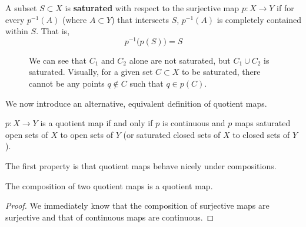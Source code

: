     \begin{definition}[Saturation]
      A subset $S \subset X$ is \textbf{saturated} with respect to the surjective map $p: X \rightarrow Y$ if for every $p^{-1} (A)$ (where $A \subset Y$) that intersects $S$, $p^{-1}(A)$ is completely contained within $S$. That is, 
      \begin{equation}
        p^{-1} \big( p(S) \big) = S
      \end{equation}

      \begin{figure}[H]
        \centering 
        \caption{We can see that $C_1$ and $C_2$ alone are not saturated, but $C_1 \cup C_2$ is saturated. Visually, for a given set $C \subset X$ to be saturated, there cannot be any points $q \not\in C$ such that $q \in p(C)$. }
        \label{fig:saturation}
      \end{figure}
    \end{definition}

    We now introduce an alternative, equivalent definition of quotient maps. 

    \begin{theorem}
      $p: X \rightarrow Y$ is a quotient map if and only if $p$ is continuous and $p$ maps saturated open sets of $X$ to open sets of $Y$ (or saturated closed sets of $X$ to closed sets of $Y$). 
    \end{theorem} 

    The first property is that quotient maps behave nicely under compositions. 

    \begin{theorem}
      The composition of two quotient maps is a quotient map. 
    \end{theorem}
    \begin{proof}
      We immediately know that the composition of surjective maps are surjective and that of continuous maps are continuous. 
    \end{proof}

